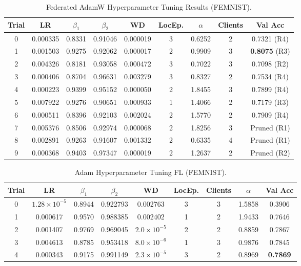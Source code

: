 \documentclass[10pt,twocolumn,letterpaper]{article}
\begin{document}
    \begin{table}[h!]
    \centering
    \caption{Federated AdamW Hyperparameter Tuning Results (FEMNIST).}
    \label{tab:adamw_tuning}
    \begin{tabular}{|c|c|c|c|c|c|c|c|c|}
    \hline
    \textbf{Trial} & \textbf{LR} & $\beta_1$ & $\beta_2$ & \textbf{WD} & \textbf{LocEp.} & $\alpha$ & \textbf{Clients} & \textbf{Val Acc} \\
    \hline
    0 & 0.000335 & 0.8331 & 0.91046 & 0.000019 & 3 & 0.6252 & 2 & 0.7321 (R4) \\
    \hline
    1 & 0.001503 & 0.9275 & 0.92062 & 0.000017 & 2 & 0.9909 & 3 & \textbf{0.8075} (R3) \\
    \hline
    2 & 0.004326 & 0.8181 & 0.93058 & 0.000472 & 3 & 0.7022 & 3 & 0.7098 (R2) \\
    \hline
    3 & 0.000406 & 0.8704 & 0.96631 & 0.003279 & 3 & 0.8327 & 2 & 0.7534 (R4) \\
    \hline
    4 & 0.000223 & 0.9399 & 0.95152 & 0.000050 & 2 & 1.8455 & 3 & 0.7899 (R4) \\
    \hline
    5 & 0.007922 & 0.9276 & 0.90651 & 0.000933 & 1 & 1.4066 & 2 & 0.7179 (R3) \\
    \hline
    6 & 0.000511 & 0.8396 & 0.92103 & 0.002024 & 2 & 1.5770 & 2 & 0.7909 (R4) \\
    \hline
    7 & 0.005376 & 0.8506 & 0.92974 & 0.000068 & 2 & 1.8256 & 3 & Pruned (R1) \\
    \hline
    8 & 0.002891 & 0.9263 & 0.91607 & 0.001332 & 2 & 0.6335 & 4 & Pruned (R1) \\
    \hline
    9 & 0.000368 & 0.9403 & 0.97347 & 0.000019 & 2 & 1.2637 & 2 & Pruned (R2) \\
    \hline
    \end{tabular}
    \end{table}

    \begin{table}[h!]
        \centering
        \caption{Adam Hyperparameter Tuning FL (FEMNIST).}
        \label{tab:adam_tuning}
        \begin{tabular}{|c|c|c|c|c|c|c|c|c|}
            \hline
            \textbf{Trial} & \textbf{LR} & $\beta_1$ & $\beta_2$ & \textbf{WD} & \textbf{LocEp.} & \textbf{Clients} & $\alpha$ & \textbf{Val Acc} \\
            \hline
            0 & $1.28\times 10^{-5}$ & 0.8944 & 0.922793 & 0.002763 & 3 & 3 & 1.5858 & 0.3906 \\
            \hline
            1 & 0.000617 & 0.9570 & 0.988385 & 0.002402 & 1 & 2 & 1.9433 & 0.7646 \\
            \hline
            2 & 0.001407 & 0.9769 & 0.969045 & $2.0\times 10^{-5}$ & 2 & 2 & 0.8859 & 0.7867 \\
            \hline
            3 & 0.004613 & 0.8785 & 0.953418 & $8.0\times 10^{-6}$ & 1 & 3 & 0.9876 & 0.7845 \\
            \hline
            4 & 0.000343 & 0.9175 & 0.991149 & $2.3\times 10^{-5}$ & 3 & 2 & 0.8969 & \textbf{0.7869} \\
            \hline
        \end{tabular}
    \end{table}
\end{document}

